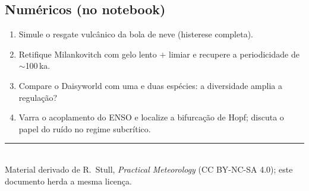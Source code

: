 \documentclass[11pt]{article}
\begin{document}
\subsection*{Numéricos (no notebook)}

\begin{enumerate}[label=\textbf{N\arabic*.},itemsep=4pt]
  \item Simule o resgate vulcânico da bola de neve (histerese
        completa).
  \item Retifique Milankovitch com gelo lento $+$ limiar e recupere a
        periodicidade de $\sim$100\,ka.
  \item Compare o Daisyworld com uma e duas espécies: a diversidade
        amplia a regulação?
  \item Varra o acoplamento do ENSO e localize a bifurcação de Hopf;
        discuta o papel do ruído no regime subcrítico.
\end{enumerate}

\vspace{1em}
\noindent\rule{\linewidth}{0.4pt}\\
{\scriptsize Material derivado de R.~Stull, \emph{Practical Meteorology}
(CC BY-NC-SA 4.0); este documento herda a mesma licença.}
\end{document}
